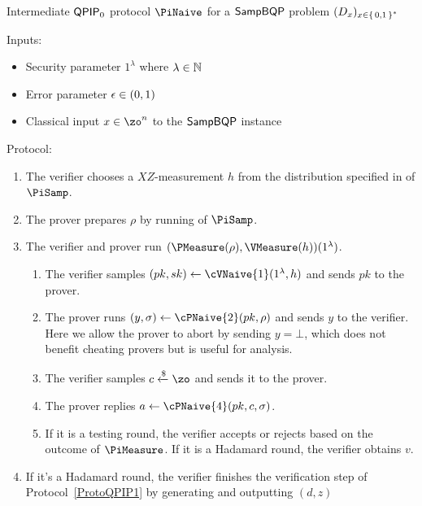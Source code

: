\begin{protocol}{Intermediate $\operatorname{\mathsf{QPIP}}_0$ protocol $\PiNaive$ for a $\operatorname{\mathsf{SampBQP}}$ problem $(D_x)_{x\in\set{0, 1}^*}$}
	\label{proto:qpip0_naive}

	Inputs:
	\begin{itemize}
		\item Security parameter $1^\lambda$ where $\lambda\in\mathbb{N}$
		\item Error parameter $\epsilon\in(0, 1)$
		\item Classical input $x\in\zo^n$ to the $\operatorname{\mathsf{SampBQP}}$ instance
	\end{itemize}

	Protocol:
	\begin{enumerate}
		\item \label{step:naive1} The verifier chooses a $XZ$-measurement $h$ from the distribution specified in  of $\PiSamp$.
		\item \label{step:naive2} The prover prepares $\rho$ by running  of $\PiSamp$.
		\item \label{step:urmila-in-naive}
			The verifier and prover run $(\PMeasure(\rho), \VMeasure(h))(1^\lambda)$.
			\begin{enumerate}
				\item The verifier samples $(pk, sk)\leftarrow\cVNaive{1}(1^\lambda, h)$ and sends $pk$ to the prover.
				\item The prover runs $(y, \sigma)\leftarrow\cPNaive{2}(pk, \rho)$ and sends $y$ to the verifier.
					Here we allow the prover to abort by sending $y=\bot$, which does not benefit cheating provers but is useful for analysis.
				\item\label{step:c-urmila-in-naive} The verifier samples $c\xleftarrow{\$}\zo$ and sends it to the prover.
				\item The prover replies $a\leftarrow\cPNaive{4}(pk, c, \sigma)$.
				\item
					If it is a testing round, the verifier accepts or rejects based on the outcome of $\PiMeasure$.
					If it is a Hadamard round, the verifier obtains $v$.
			\end{enumerate}
		\item \label{step:naive-output} If it's a Hadamard round, the verifier finishes the verification step of Protocol~\ref{ProtoQPIP1} by generating and outputting $(d, z)$
	\end{enumerate}
\end{protocol}

